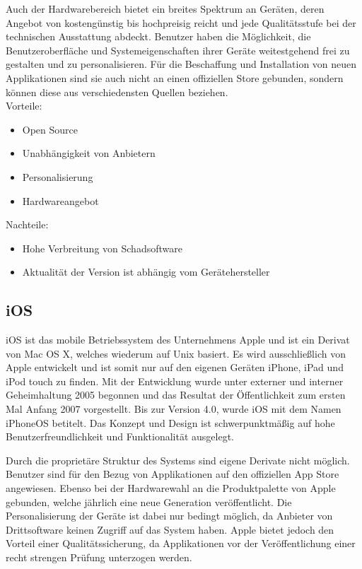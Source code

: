 Auch der Hardwarebereich bietet ein breites Spektrum an Geräten, deren Angebot von kostengünstig bis hochpreisig reicht und jede Qualitätsstufe bei der technischen Ausstattung abdeckt. Benutzer haben die Möglichkeit, die Benutzeroberfläche und Systemeigenschaften ihrer Geräte weitestgehend frei zu gestalten und zu personalisieren. Für die Beschaffung und Installation von neuen Applikationen sind sie auch nicht an einen offiziellen Store gebunden, sondern können diese aus verschiedensten Quellen beziehen.
\\

Vorteile:
\begin{itemize}
	\item Open Source
	\item Unabhängigkeit von Anbietern
	\item Personalisierung
	\item Hardwareangebot
\end{itemize}

Nachteile:
\begin{itemize}
	\item Hohe Verbreitung von Schadsoftware
	\item Aktualität der Version ist abhängig vom Gerätehersteller
\end{itemize}

\subsection{iOS}
iOS ist das mobile Betriebssystem des Unternehmens Apple und ist ein Derivat von Mac OS X, welches wiederum auf Unix basiert. Es wird ausschließlich von Apple entwickelt und ist somit nur auf den eigenen Geräten iPhone, iPad und iPod touch zu finden. Mit der Entwicklung wurde unter externer und interner Geheimhaltung 2005 begonnen und das Resultat der Öffentlichkeit zum ersten Mal Anfang 2007 vorgestellt. Bis zur Version 4.0, wurde iOS mit dem Namen iPhoneOS betitelt. Das Konzept und Design ist schwerpunktmäßig auf hohe Benutzerfreundlichkeit und Funktionalität ausgelegt. 

Durch die proprietäre Struktur des Systems sind eigene Derivate nicht möglich. Benutzer sind für den Bezug von Applikationen auf den offiziellen App Store angewiesen.
Ebenso bei der Hardwarewahl an die Produktpalette von Apple gebunden, welche jährlich eine neue Generation veröffentlicht. Die Personalisierung der Geräte ist dabei nur bedingt möglich, da Anbieter von Drittsoftware keinen Zugriff auf das System haben. Apple bietet jedoch den Vorteil einer Qualitätssicherung, da Applikationen vor der Veröffentlichung einer recht strengen Prüfung unterzogen werden.
\\

